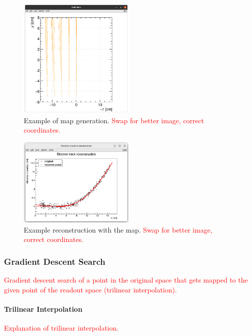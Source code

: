 \documentclass[]{article}
\begin{document}
	\begin{figure}
		\centering
		\includegraphics[width=0.5\textwidth]{map_9010_gen.png}
		\caption{Example of map generation. \textcolor{red}{Swap for better image, correct coordinates.}}
		\label{fig:map9010gen}
	\end{figure}
	
	\begin{figure}
		\centering
		\includegraphics[width=0.5\textwidth]{9010_reco.png}
		\caption{Example reconstruction with the map. \textcolor{red}{Swap for better image, correct coordinates.}}
		\label{fig:9010reco}
	\end{figure}
	
	\subsubsection{Gradient Descent Search}
	\textcolor{red}{Gradient descent search of a point in the original space that gets mapped to the given point of the readout space (trilinear interpolation).}
	
	\paragraph{Trilinear Interpolation}
	\textcolor{red}{\newline Explanation of trilinear interpolation.}
	
\end{document}

